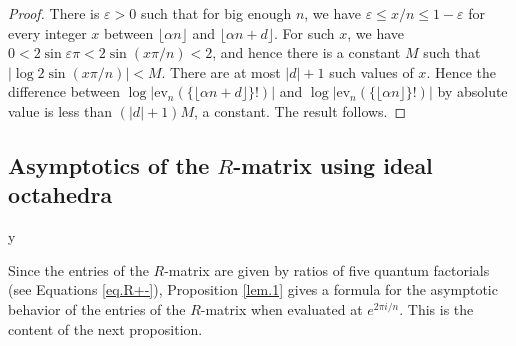 \documentclass{amsart}
\theoremstyle{definition}
\def\printname#1{
    \if\draft y
        \smash{\makebox[0pt]{\hspace{-0.5in}
            \raisebox{8pt}{\tt\tiny #1}}}
    \fi
}
\def\lbl#1{\label{#1}\printname{#1}}
\def\a{\alpha}
\def\ve{\varepsilon}
\def\ev{\mathrm{ev}}
\begin{document}
\begin{proof}
There is $\ve >0$ such that for big enough $n$, we
have $\ve \le x/n \le 1-\ve$ for every integer $x$ between $\lfloor
\a n \rfloor$ and $\lfloor \a n  +d \rfloor$. For such $x$, we have
$ 0< 2 \sin \ve \pi   < 2\sin (x\pi/n)  < 2$, and hence there is a
constant $M$ such that $|\log 2\sin (x\pi/n) | < M$. There are at most
$|d|+1$ such values of $x$. Hence the difference  between
$\log\left|\ev_n (\{ \lfloor \a n  +d \rfloor \}!)\right|$ and $
\log\left|\ev_n (\{ \lfloor \a n \rfloor \}!)\right|$ by absolute
value is less than $(|d|+1) M$, a constant. The result follows.
\end{proof}

\subsection{Asymptotics of the $R$-matrix using ideal octahedra}
\lbl{sub.assRv8}

Since the entries of the $R$-matrix are given by ratios of five quantum
factorials (see Equations \eqref{eq.R+-}), Proposition \ref{lem.1}
gives a formula for the asymptotic behavior of the entries of the
$R$-matrix when evaluated at $e^{2 \pi i/n}$.
This is the content of the next proposition.
\end{document}
